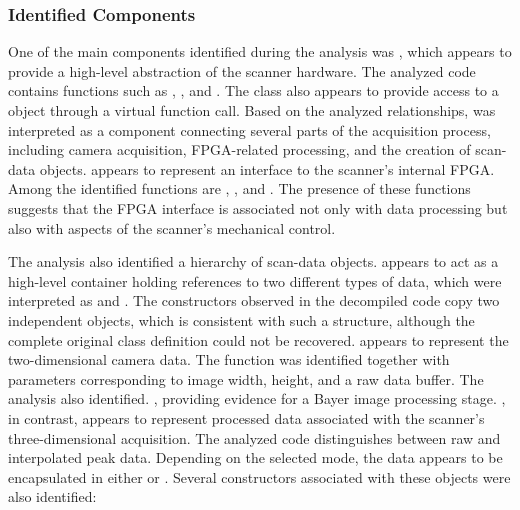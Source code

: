 \subsubsection{Identified Components}

One of the main components identified during the analysis was , which appears to provide a high-level abstraction of the scanner hardware. The analyzed code contains functions such as , , and . The class also appears to provide access to a  object through a virtual function call. Based on the analyzed relationships,  was interpreted as a component connecting several parts of the acquisition process, including camera acquisition, FPGA-related processing, and the creation of scan-data objects.  appears to represent an interface to the scanner's internal FPGA. Among the identified functions are , , and . The presence of these functions suggests that the FPGA interface is associated not only with data processing but also with aspects of the scanner's mechanical control.

The analysis also identified a hierarchy of scan-data objects.  appears to act as a high-level container holding references to two different types of data, which were interpreted as  and . The constructors observed in the decompiled code copy two independent  objects, which is consistent with such a structure, although the complete original class definition could not be recovered.  appears to represent the two-dimensional camera data. The function  was identified together with parameters corresponding to image width, height, and a raw data buffer. The analysis also identified. , providing evidence for a Bayer image processing stage. , in contrast, appears to represent processed data associated with the scanner's three-dimensional acquisition. The analyzed code distinguishes between raw and interpolated peak data. Depending on the selected mode, the data appears to be encapsulated in either  or . Several constructors associated with these objects were also identified:

